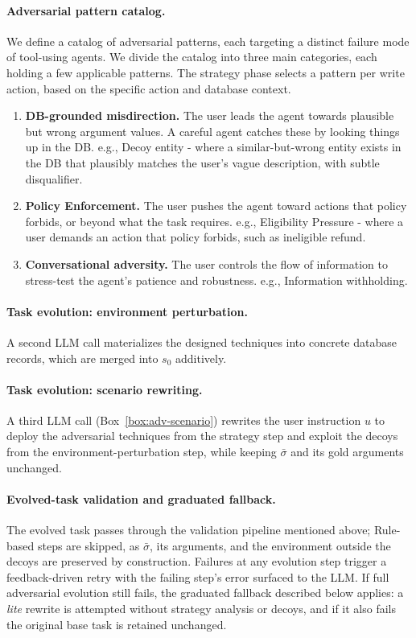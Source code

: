 \paragraph{Adversarial pattern catalog.}
\label{app:adversarial-patterns}
We define a catalog of adversarial patterns, each targeting a distinct failure mode of tool-using agents. We divide the catalog into three main categories, each holding a few applicable patterns. The strategy phase selects a pattern per write action, based on the specific action and database context.
\begin{enumerate}
    \item \textbf{DB-grounded misdirection.} The user leads the agent towards plausible but wrong argument values. A careful agent catches these by looking things up in the DB. e.g., Decoy entity - where a similar-but-wrong entity exists in the DB that plausibly matches the user's vague description, with subtle disqualifier.
    \item \textbf{Policy Enforcement.} The user pushes the agent toward actions that policy forbids, or beyond what the task requires. e.g., Eligibility Pressure - where a user demands an action that policy forbids, such as ineligible refund.
    \item \textbf{Conversational adversity.} The user controls the flow of information to stress-test the agent's patience and robustness. e.g., Information withholding.
\end{enumerate}

\paragraph{Task evolution: environment perturbation.}
A second LLM call materializes the designed techniques into concrete database records, which are merged into $s_0$ additively.

\paragraph{Task evolution: scenario rewriting.}
A third LLM call (Box~\ref{box:adv-scenario}) rewrites the user instruction $u$ to deploy the adversarial techniques from the strategy step and exploit the decoys from the environment-perturbation step, while keeping $\bar{\sigma}$ and its gold arguments unchanged.

\paragraph{Evolved-task validation and graduated fallback.}
The evolved task passes through the validation pipeline mentioned above; Rule-based steps are skipped, as $\bar{\sigma}$, its arguments, and the environment outside the decoys are preserved by construction. Failures at any evolution step trigger a feedback-driven retry with the failing step's error surfaced to the LLM. If full adversarial evolution still fails, the graduated fallback described below applies: a \emph{lite} rewrite is attempted without strategy analysis or decoys, and if it also fails the original base task is retained unchanged.

